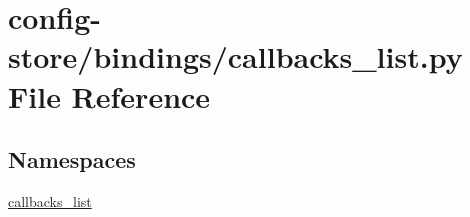 \hypertarget{config-store_2bindings_2callbacks__list_8py}{}\section{config-\/store/bindings/callbacks\+\_\+list.py File Reference}
\label{config-store_2bindings_2callbacks__list_8py}
\subsection*{Namespaces}
\begin{DoxyCompactItemize}
\item 
 \hyperlink{namespacecallbacks__list}{callbacks\+\_\+list}
\end{DoxyCompactItemize}

